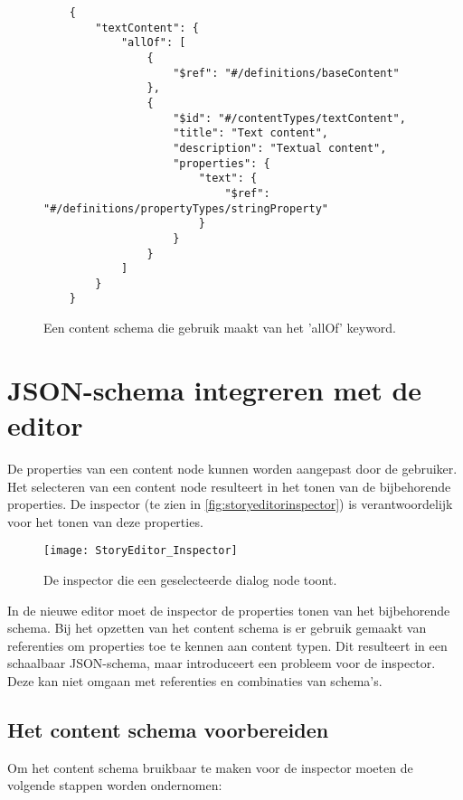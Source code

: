 \begin{figure}[htb]
    \centering
    \lstset{language=JSON}
    \begin{lstlisting}
    {
        "textContent": {
            "allOf": [
                {
                    "$ref": "#/definitions/baseContent"
                },
                {
                    "$id": "#/contentTypes/textContent",
                    "title": "Text content",
                    "description": "Textual content",
                    "properties": {
                        "text": {
                            "$ref": "#/definitions/propertyTypes/stringProperty"
                        }
                    }
                }
            ]
        }
    }
    \end{lstlisting}
    \caption{Een content schema die gebruik maakt van het 'allOf' keyword.}
    \label{fig:jsonschemaallofexample}
\end{figure}

\section{JSON-schema integreren met de editor}
De properties van een content node kunnen worden aangepast door de gebruiker. Het selecteren van een content node resulteert in het tonen van de bijbehorende properties. De inspector (te zien in \autoref{fig:storyeditorinspector}) is verantwoordelijk voor het tonen van deze properties.

\begin{figure}[htb]
    \texttt{[image: StoryEditor\_Inspector]}
    \caption{De inspector die een geselecteerde dialog node toont.}
    \label{fig:storyeditorinspector}
    \centering
\end{figure}

In de nieuwe editor moet de inspector de properties tonen van het bijbehorende schema. Bij het opzetten van het content schema is er gebruik gemaakt van referenties om properties toe te kennen aan content typen. Dit resulteert in een schaalbaar JSON-schema, maar introduceert een probleem voor de inspector. Deze kan niet omgaan met referenties en combinaties van schema’s.

\subsection{Het content schema voorbereiden}
Om het content schema bruikbaar te maken voor de inspector moeten de volgende stappen worden ondernomen:

